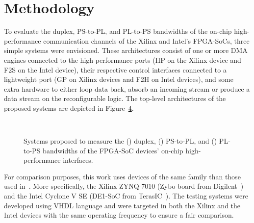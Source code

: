 \section{Methodology}\label{sec:methodology}

To evaluate the duplex, \ac{PS}-to-\ac{PL}, and \ac{PL}-to-\ac{PS} bandwidths of the on-chip high-performance communication channels of the Xilinx and Intel's \ac{FPGA}-\acp{SoC}, three simple systems were envisioned. These architectures consist of one or more \ac{DMA} engines connected to the high-performance ports (\ac{HP} on the Xilinx device and \ac{F2S} on the Intel device), their respective control interfaces connected to a lightweight port (\ac{GP} on Xilinx devices and \ac{F2H} on Intel devices), and some extra hardware to either loop data back, absorb an incoming stream or produce a data stream on the reconfigurable logic. The top-level architectures of the proposed systems are depicted in Figure~\ref{fig:evaluation_circuit}.

\begin{figure}[t]
    \centering
    \begin{subfigure}[m]{.5\linewidth}
        \centering
        
        \caption{}
        \label{fig:evaluation_duplex}
    \end{subfigure}\hfill
    \begin{subfigure}[m]{.5\linewidth}
        \centering
        
        \caption{}
        \label{fig:evaluation_ps2pl}
    \end{subfigure}\\\medskip
    \begin{subfigure}[m]{.5\linewidth}
        \centering
        
        \caption{}
        \label{fig:evaluation_pl2ps}
    \end{subfigure}
    \caption{Systems proposed to measure the () duplex, () \ac{PS}-to-\ac{PL}, and () \ac{PL}-to-\ac{PS} bandwidths of the \ac{FPGA}-\ac{SoC} devices' on-chip high-performance interfaces.}
    \label{fig:evaluation_circuit}
\end{figure}

For comparison purposes, this work uses devices of the same family than those used in~\cite{DBLP:conf/arc/GobelECMJ17}. More specifically, the Xilinx ZYNQ-7010 (Zybo board from Digilent~\cite{zybo}) and the Intel Cyclone V SE (DE1-SoC from TerasIC~\cite{de1soc}). The testing systems were developed using \ac{VHDL} language and were targeted in both the Xilinx and the Intel devices with the same operating frequency to ensure a fair comparison.

